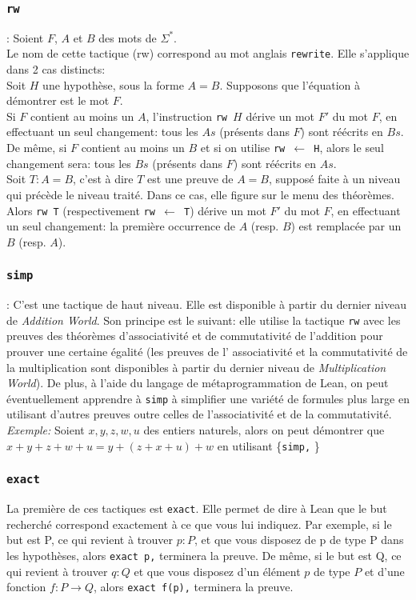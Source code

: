 \subsubsection {\texttt{rw}}: Soient $F$, $A$ et $B$ des mots de $\Sigma^*$.\\
Le nom de cette tactique (rw) correspond au mot anglais \texttt{rewrite}. Elle s'applique dans 2 cas distincts:\\
Soit $H$ une hypothèse, sous la forme $A=B$. Supposons que l'équation à démontrer est le mot $F$. \\Si $F$ contient au moins un $A$, l'instruction \texttt{rw $H$} dérive un mot $F'$ du mot $F$, en effectuant un seul changement: tous les $As$ (présents dans $F$) sont réécrits en $Bs$. De même, si $F$ contient au moins un $B$ et si on utilise \texttt{rw $\leftarrow$ H}, alors le seul changement sera: tous les $Bs$ (présents dans $F$) sont réécrits en $As$.\\
Soit $T: A=B$, c'est à dire $T$ est une preuve de $A=B$, supposé faite à un niveau qui précède le niveau traité. Dans ce cas, elle figure sur le menu des théorèmes. Alors \texttt{rw T} (respectivement \texttt{rw $\leftarrow$ T}) dérive un mot $F'$ du mot $F$, en effectuant un seul changement: la première occurrence de $A$ (resp. $B$) est remplacée par un $B$ (resp. $A$). 

\subsubsection {\texttt{simp}}: C'est une tactique de haut niveau. Elle est disponible à partir du dernier niveau de \textit{Addition World}. Son principe est le suivant: elle utilise la tactique \texttt{rw} avec les preuves des théorèmes d'associativité et de commutativité de l'addition pour prouver une certaine égalité (les preuves de l' associativité et la commutativité de la multiplication sont disponibles à partir du dernier niveau de \textit{Multiplication World}). De plus, à l'aide du langage de métaprogrammation de Lean, on peut éventuellement apprendre  à \texttt{simp} à simplifier une variété de formules plus large en utilisant d'autres preuves outre celles de l'associativité et de la commutativité.   \\
\textit{Exemple:} Soient $x,y,z,w,u$ des entiers naturels, alors on peut démontrer que $x+y+z+w+u=y+(z+x+u)+w$ en utilisant \big\{\texttt{simp,} \big\}



\subsubsection{\texttt{exact}}
La première de ces tactiques est \texttt{exact}. Elle permet de dire à Lean que le but recherché correspond exactement à ce que vous lui indiquez. Par exemple, si le but est P, ce qui revient à trouver $p:P$, et que vous disposez de p de type P dans les hypothèses, alors \texttt{exact p,} terminera la preuve. De même, si le but est Q, ce qui revient à trouver $q:Q$ et que vous disposez d'un élément $p$ de type $P$ et d'une fonction $f : P \to Q$, alors \texttt{exact f(p),} terminera la preuve.\\
